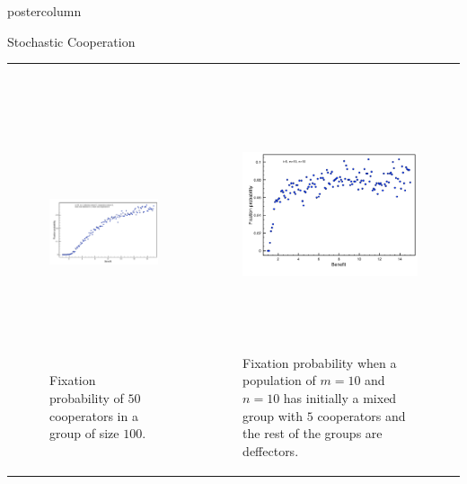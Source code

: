 \documentclass[final,hyperref={pdfpagelabels=false}]{beamer}
\begin{document}
\begin{frame}
\begin{columns}
\begin{column}{.49\textwidth}
\begin{beamercolorbox}[center,wd=\textwidth]{postercolumn}
\begin{minipage}[T]{.95\textwidth}
{\begin{block}{Stochastic Cooperation}
\begin{tabularx}{\linewidth}{ZZ}
                       \begin{figure}
                     \includegraphics[width=11cm,height=8cm]{images/probaCoopeSinglegroup.pdf}
                     \caption{Fixation probability of $50$ cooperators in a group of size $100$.}
                     \end{figure}

                     &
                       \begin{figure}
                     \includegraphics[width=11cm,height=8cm]{images/probaCoomixedGroup.pdf}
                     \caption{Fixation probability when a population of $m=10$ and $n=10$ has initially a mixed group with $5$ cooperators and the rest of the groups are deffectors.}
                     \end{figure}
                       \\
                   \end{tabularx}


\end{block}}
\end{minipage}
\end{beamercolorbox}
\end{column}
\end{columns}
\end{frame}
\end{document}
